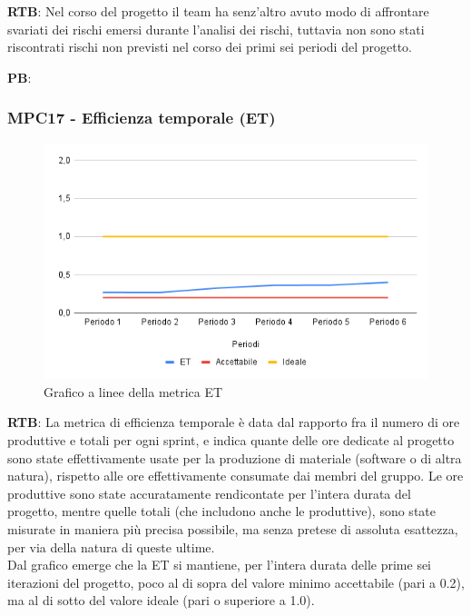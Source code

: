 \documentclass[10pt]{article}
\begin{document}
\begin{justify}
\textbf{RTB}: Nel corso del progetto il team ha senz'altro avuto modo di affrontare svariati dei rischi emersi durante l'analisi dei rischi, tuttavia non sono stati
riscontrati rischi non previsti nel corso dei primi sei periodi del progetto.

\noindent
\textbf{PB}:


\subsubsection{MPC17 - Efficienza temporale (ET)}%

\begin{figure}[H]
  \centering
  \includegraphics[width=0.9\linewidth]{ET.png}
  \caption{Grafico a linee della metrica ET}
  \label{fig:ETchart}
\end{figure}

\textbf{RTB}: La metrica di efficienza temporale è data dal rapporto fra il numero di ore produttive e totali per ogni sprint, e indica quante delle ore dedicate al progetto
sono state effettivamente usate per la produzione di materiale (software o di altra natura), rispetto alle ore effettivamente consumate dai membri del gruppo. Le ore produttive sono state accuratamente rendicontate per l'intera durata del progetto, mentre quelle totali (che includono anche le produttive), sono state misurate in
maniera più precisa possibile, ma senza pretese di assoluta esattezza, per via della natura di queste ultime.\\
Dal grafico emerge che la ET si mantiene, per l'intera durata delle prime sei iterazioni del progetto, poco al di sopra del valore minimo accettabile (pari a 0.2), ma al di 
sotto del valore ideale (pari o superiore a 1.0).\\


\end{justify}
\end{document}
